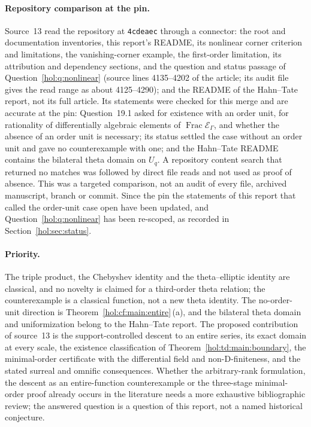 \documentclass[11pt]{article}
\numberwithin{equation}{section}
\theoremstyle{definition}
\theoremstyle{remark}
\newcommand{\E}{\mathcal E_\Gamma}
\begin{document}
\paragraph{Repository comparison at the pin.}
Source~13 read the repository at \texttt{4cdeaec} through a connector: the
root and documentation inventories, this report's README, its nonlinear corner
criterion and limitations, the vanishing-corner example, the first-order
limitation, its attribution and dependency sections, and the question and
status passage of Question~\ref{hol:q:nonlinear} (source lines 4135--4202 of
the article; its audit file gives the read range as about 4125--4290); and the
README of the Hahn--Tate report, not its full article. Its statements were
checked for this merge and are accurate at the pin: Question~19.1 asked for
existence with an order unit, for rationality of differentially algebraic
elements of $\operatorname{Frac}\E$, and whether the absence of an order unit
is necessary; its status settled the case without an order unit and gave no
counterexample with one; and the Hahn--Tate README contains the bilateral
theta domain on $U_q$. A repository content search that returned no matches
was followed by direct file reads and not used as proof of absence. This was a
targeted comparison, not an audit of every file, archived manuscript, branch or
commit. Since the pin the statements of this report that called the
order-unit case open have been updated, and Question~\ref{hol:q:nonlinear} has
been re-scoped, as recorded in Section~\ref{hol:sec:status}.

\paragraph{Priority.}
The triple product, the Chebyshev identity and the theta--elliptic identity
are classical, and no novelty is claimed for a third-order theta relation; the
counterexample is a classical function, not a new theta identity. The
no-order-unit direction is Theorem~\ref{hol:cf:main:entire}\,(a), and the
bilateral theta domain and uniformization belong to the Hahn--Tate report. The
proposed contribution of source~13 is the support-controlled descent to an
entire series, its exact domain at every scale, the existence classification
of Theorem~\ref{hol:td:main:boundary}, the minimal-order certificate with the
differential field and non-D-finiteness, and the stated surreal and omnific
consequences. Whether the arbitrary-rank formulation, the descent as an
entire-function counterexample or the three-stage minimal-order proof already
occurs in the literature needs a more exhaustive bibliographic review; the
answered question is a question of this report, not a named historical
conjecture.
\end{document}
